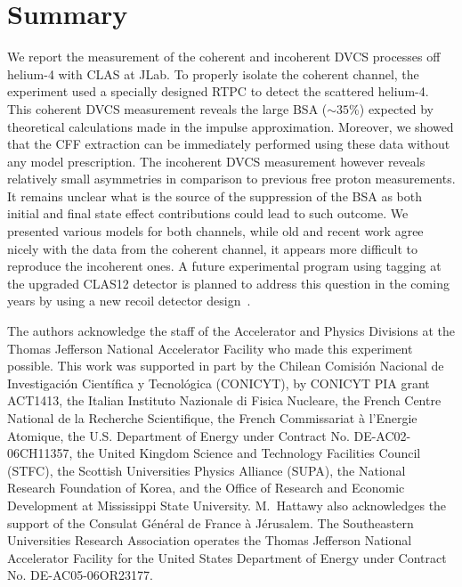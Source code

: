 \documentclass[aps,prc,preprint,superscriptaddress]{revtex4}
\begin{document}
\section{Summary}

We report the measurement of the coherent and incoherent DVCS processes off helium-4 with
CLAS at JLab. To properly isolate the coherent channel, the experiment used a specially 
designed RTPC to detect the scattered helium-4. This coherent 
DVCS measurement reveals the large BSA ($\sim 35$\%) expected by theoretical calculations
made in the impulse approximation. Moreover, we showed that the CFF extraction can be 
immediately performed using these data without any model prescription. The incoherent DVCS measurement 
however reveals relatively small asymmetries in comparison to previous free proton 
measurements. It remains unclear what is the source of the suppression of the BSA as both 
initial and final state effect contributions could lead to such outcome. We presented 
various models for both channels, while old and recent work agree nicely with the data
from the coherent channel, it appears more difficult to reproduce the incoherent ones.
A future experimental program using tagging at the upgraded CLAS12 detector is 
planned to address this question in the coming years by using a new recoil detector 
design~\cite{Armstrong:2017zcm}.


\begin{acknowledgments}
The authors acknowledge the staff of the Accelerator and Physics Divisions at 
the Thomas Jefferson National Accelerator Facility who made this experiment 
possible. This work was supported in part by the Chilean Comisi\'on Nacional de 
Investigaci\'on Cient\'ifica y Tecnol\'ogica (CONICYT), by CONICYT PIA grant 
ACT1413, the Italian Instituto Nazionale di Fisica Nucleare, the French Centre 
National de la Recherche Scientifique, the French Commissariat \`a l'Energie 
Atomique, the U.S. Department of Energy under Contract No. DE-AC02-06CH11357, 
the United Kingdom Science and Technology Facilities Council (STFC), the 
Scottish Universities Physics Alliance (SUPA), the National Research Foundation 
of Korea, and the Office of Research and Economic Development at Mississippi 
State University. M.~Hattawy also acknowledges the support of the Consulat 
G\'en\'eral de France \`a J\'erusalem.  The Southeastern Universities Research 
Association operates the Thomas Jefferson National Accelerator Facility for the 
United States Department of Energy under Contract No. DE-AC05-06OR23177.
\end{acknowledgments}
\end{document}
